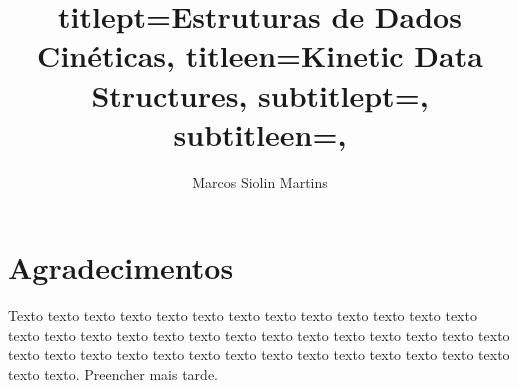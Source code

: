 \documentclass[12pt,twoside,english,brazilian]{book}
\title{
    titlept={Estruturas de Dados Cinéticas},
    titleen={Kinetic Data Structures},
    subtitlept={},
    subtitleen={},
}
\author{Marcos Siolin Martins}
\begin{document}

\frontmatter

\pagestyle{plain}

\onehalfspacing %

\maketitle %




\chapter*{Agradecimentos}

Texto texto texto texto texto texto texto texto texto texto texto texto texto
texto texto texto texto texto texto texto texto texto texto texto texto texto
texto texto texto texto texto texto texto texto texto texto texto texto texto
texto texto texto texto. Preencher mais tarde.




\end{document}
